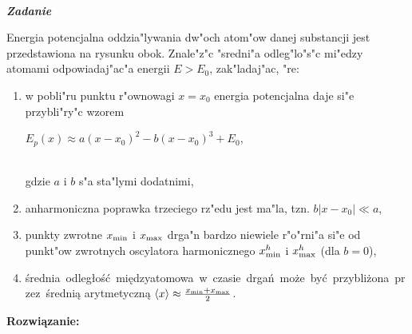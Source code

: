 \documentclass[11pt,a4paper]{article}
\newcounter{zadanie}\newcommand{\zadanie}[1][]{\addtocounter{zadanie}{1} ~\\  {\bf \emph{Zadanie \arabic{zadanie} #1 }} \\}
\begin{document}
\zadanie
\begin{figure}\vspace{-1cm}
\end{figure}
Energia potencjalna oddzia"lywania dw"och atom"ow danej substancji jest
przedstawiona na rysunku obok. Znale"z"c "sredni"a
odleg"lo"s"c mi"edzy atomami odpowiadaj"ac"a energii $E>E_0$,
zak"ladaj"ac, "re:
\begin{enumerate}
\item 
\parbox[t]{\linewidth}{
w pobli"ru punktu r"ownowagi $x=x_0$ energia 
potencjalna daje si"e przybli"ry"c wzorem\\[2mm] 
\centerline{$E_p(x) \approx a (x-x_0)^2 - b (x-x_0)^3 + E_0$,}\\[2mm]
gdzie $a$ i $b$ s"a sta"lymi dodatnimi,
}
\item anharmoniczna poprawka trzeciego rz"edu jest ma"la, tzn. \mbox{$b |x-x_0|\ll a$},
\item punkty zwrotne $x_{\rm min}$ i $x_{\rm max}$
drga"n bardzo niewiele r"o"rni"a si"e od punkt"ow zwrotnych
oscylatora harmonicznego $x^h_{\rm min}$ i $x^h_{\rm max}$ (dla $b=0$),
\item \mbox{średnia odległość międzyatomowa w czasie drgań może być
przybliżona przez średnią} arytmetyczną $\langle x\rangle \approx \frac{x_{\rm min}+x_{\rm max}}{2}$.
\end{enumerate}
\vskip 10pt
\textbf{Rozwiązanie:}
\end{document}
